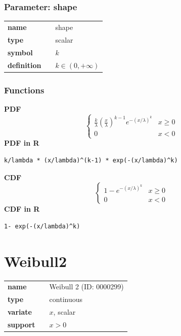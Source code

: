 \documentclass{article}
\begin{document}
\subsubsection*{Parameter: shape}

\noindent\begin{tabular}{p{2cm}cl}
\textbf{name} & & shape \\
\textbf{type} & & scalar \\
\textbf{symbol} & & $k$  \\
\textbf{definition} & & $k\in (0, +\infty)$
\end{tabular}
\subsubsection*{Functions}

\smallskip \noindent \hspace{.2cm} \textbf{PDF} 
\begin{equation*}\begin{cases}
\frac{k}{\lambda}\left(\frac{x}{\lambda}\right)^{k-1}e^{-(x/\lambda)^{k}} & x\geq0\\
0 & x<0\end{cases}\end{equation*}
\smallskip \noindent \hspace{.2cm} \textbf{PDF in R}  
\begin{verbatim}k/lambda * (x/lambda)^(k-1) * exp(-(x/lambda)^k)\end{verbatim}
\smallskip \noindent \hspace{.2cm} \textbf{CDF} 
\begin{equation*}\begin{cases}1- e^{-(x/\lambda)^k} & x\geq0\\ 0 & x<0\end{cases}\end{equation*}
\smallskip \noindent \hspace{.2cm} \textbf{CDF in R} 
\begin{verbatim}1- exp(-(x/lambda)^k)\end{verbatim}
\smallskip\section*{Weibull2} 

  \bigskip 

\begin{tabular}{p{2cm}cl}
\textbf{name} & & Weibull 2 (ID: 0000299)\\ 
 
\textbf{type} & & continuous \\ 

\textbf{variate} & & $x$, scalar \\ 

\textbf{support} & & $x > 0$
\end{tabular}
\end{document}
